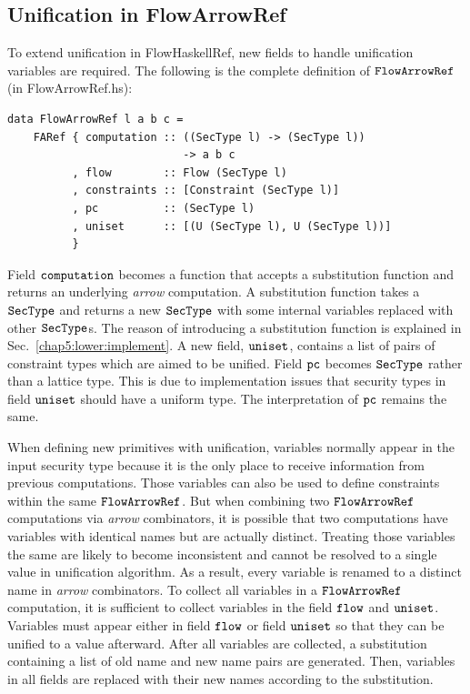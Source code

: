 \documentclass[a4paper]{report}
\newcommand{\co}[1]{$\cod{#1}$}
\begin{document}
\subsection{Unification in FlowArrowRef}
\label{chap4:unification:flowarrowref}
To extend unification in FlowHaskellRef, new fields to handle unification variables are required.
The following is the complete definition of \co{FlowArrowRef}(in FlowArrowRef.hs):
\begin{Verbatim}[fontsize=\footnotesize]
data FlowArrowRef l a b c = 
    FARef { computation :: ((SecType l) -> (SecType l)) 
                           -> a b c
          , flow        :: Flow (SecType l)
          , constraints :: [Constraint (SecType l)]
          , pc          :: (SecType l)
          , uniset      :: [(U (SecType l), U (SecType l))]
          }
\end{Verbatim}
Field \co{computation} becomes a function that accepts a substitution function and returns an underlying
{\em arrow} computation. A substitution function takes a \co{SecType} and returns a new \co{SecType} with some 
internal variables replaced with other \co{SecType}s.
The reason of introducing a substitution function is explained in Sec.~\ref{chap5:lower:implement}.
A new field, \co{uniset}, contains a list of pairs of constraint types which are aimed 
to be unified.
Field \co{pc} becomes \co{SecType} rather than a lattice type. This is due to implementation issues that 
security types in field \co{uniset} should have a uniform type.
The interpretation of \co{pc} remains the same.

When defining new primitives with unification, variables normally appear in the input security type 
because it is the only place to receive information from previous computations.
Those variables can also be used to define constraints within the 
same \co{FlowArrowRef}. But when combining two \co{FlowArrowRef} computations via {\em arrow} combinators,
it is possible that two computations have variables with identical names but are actually distinct.
Treating those variables the same are likely to become inconsistent and cannot be resolved to a single value 
in unification algorithm. 
As a result, every variable is renamed to a distinct name in {\em arrow} combinators. 
To collect all variables in a \co{FlowArrowRef} computation, it is sufficient to collect variables in the field
\co{flow} and \co{uniset}. Variables must appear either in field \co{flow} or field
\co{uniset} so that they can be unified to a value afterward. 
After all variables are collected, a substitution containing a list of old name and new name pairs are
generated.
Then, variables in all fields are replaced with their new names according to the substitution.
\end{document}
